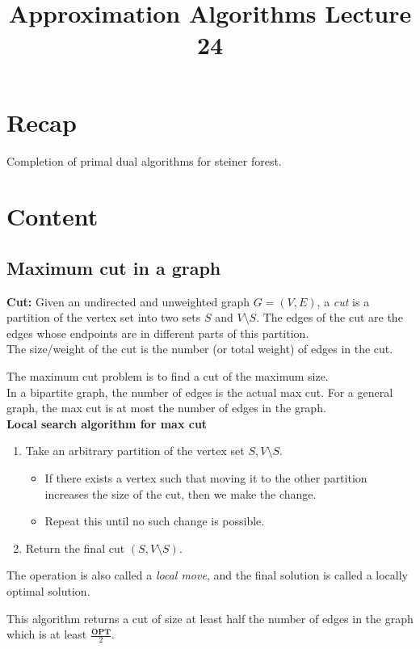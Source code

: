 \documentclass[a4paper]{article}
\title{\textbf{Approximation Algorithms Lecture 24}}
\date{}
\newcommand{\nl}{\vspace{0.2cm}\\}
\newcommand{\OPT}{\mathbf{OPT}}
\begin{document}
\maketitle
\tableofcontents

\section{Recap}

Completion of primal dual algorithms for steiner forest.

\section{Content}

\subsection{Maximum cut in a graph}
\begin{defn}
    \textbf{Cut:} Given an undirected and unweighted graph $G = (V, E)$, a \emph{cut} is a partition of the vertex set into two sets $S$ and $V \setminus S$. The edges of the cut are the edges whose endpoints are in different parts of this partition.\nl
The size/weight of the cut is the number (or total weight) of edges in the cut.
\end{defn}
The maximum cut problem is to find a cut of the maximum size.\nl
In a bipartite graph, the number of edges is the actual max cut. For a general graph, the max cut is at most the number of edges in the graph.\nl
\textbf{Local search algorithm for max cut}
\begin{enumerate}
    \item Take an arbitrary partition of the vertex set $S, V \setminus S$.
        \begin{itemize}
            \item If there exists a vertex such that moving it to the other partition increases the size of the cut, then we make the change.
            \item Repeat this until no such change is possible.
        \end{itemize}
    \item Return the final cut $(S, V \setminus S)$.
\end{enumerate}
The operation is also called a \emph{local move}, and the final solution is called a locally optimal solution.\nl
\begin{claim}
This algorithm returns a cut of size at least half the number of edges in the graph which is at least $\frac{\OPT}{2}$.
\end{claim}
\end{document}
